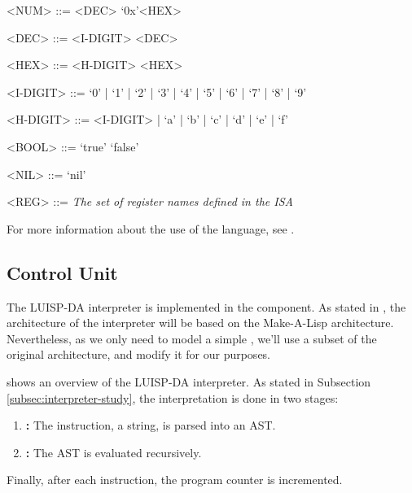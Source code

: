 \begin{tcolorbox}[enhanced jigsaw,breakable,top=4mm]
\begin{grammar}
    <NUM> ::= <DEC>
      \alt `0x'<HEX>

    <DEC> ::= <I-DIGIT>
      <DEC>

    <HEX> ::= <H-DIGIT>
      <HEX>

    <I-DIGIT> ::= `0' | `1' | `2' | `3' | `4' | `5' | `6' | `7' | `8' | `9'

    <H-DIGIT> ::= <I-DIGIT> | `a' | `b' | `c' | `d' | `e' | `f'

    <BOOL> ::= `true'
      \alt `false'

    <NIL> ::= `nil'

    <REG> ::= \textit{The set of \gls{register} names defined in the \gls{ISA}}
  \end{grammar}
\end{tcolorbox}

\noindent
For more information about the use of the language, see .


\subsection{Control Unit}\label{subsec:interpreter-design}
The LUISP-DA \gls{interpreter} is implemented in the  component. As stated in , the architecture of the \gls{interpreter} will be based on the Make-A-Lisp \parencite{mal} architecture. Nevertheless, as we only need to model a simple , we'll use a subset of the original architecture, and modify it for our purposes.

 shows an overview of the LUISP-DA interpreter. As stated in Subsection \ref{subsec:interpreter-study}, the interpretation is done in two stages:
\begin{enumerate}
  \item \textbf{:} The instruction, a string, is parsed into an \gls{AST}.
  \item \textbf{:} The \gls{AST} is evaluated recursively.
\end{enumerate}

Finally, after each instruction, the \gls{program counter} is incremented.


